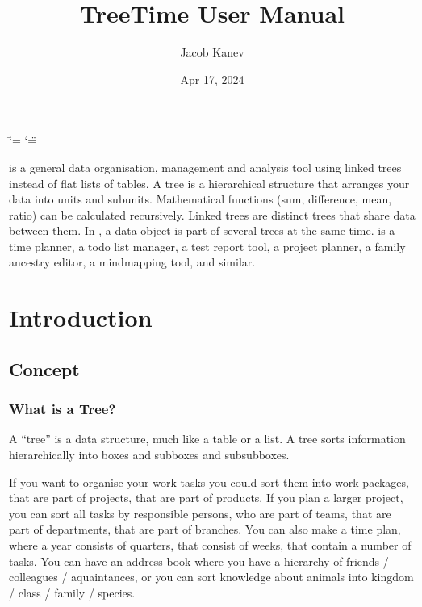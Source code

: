 \documentclass[letterpaper,10pt,english]{sphinxmanual}
\title{TreeTime User Manual}
\date{Apr 17, 2024}
\author{Jacob Kanev}
\begin{document}
\ifdefined\shorthandoff
  \ifnum\catcode`\=\string=\active\shorthandoff{=}\fi
  \ifnum\catcode`\"=\active{}\fi
\fi

\pagestyle{empty}
\sphinxmaketitle
\pagestyle{plain}
\sphinxtableofcontents
\pagestyle{normal}
\label{\detokenize{index::doc}}

\sphinxAtStartPar
{} is a general data organisation, management and analysis tool using linked trees instead of flat lists of tables.
A tree is a hierarchical structure that arranges your data into units and sub\sphinxhyphen{}units.
Mathematical functions (sum, difference, mean, ratio) can be calculated recursively.
Linked trees are distinct trees that share data between them.
In , a data object is part of several trees at the same time.
 is a time planner, a to\sphinxhyphen{}do list manager, a test report tool, a project planner, a family ancestry editor, a mind\sphinxhyphen{}mapping tool, and similar.



\sphinxstepscope


\chapter{Introduction}
\label{\detokenize{introduction:introduction}}\label{\detokenize{introduction::doc}}

\section{Concept}
\label{\detokenize{introduction:concept}}

\subsection{What is a Tree?}
\label{\detokenize{introduction:what-is-a-tree}}
\sphinxAtStartPar
A “tree” is a data structure, much like a table or a list.
A tree sorts information hierarchically into boxes and sub\sphinxhyphen{}boxes and sub\sphinxhyphen{}sub\sphinxhyphen{}boxes.

\sphinxAtStartPar
If you want to organise your work tasks you could sort them into work packages, that are part of projects, that are part of products.
If you plan a larger project, you can sort all tasks by responsible persons, who are part of teams, that are part of departments, that are part of branches.
You can also make a time plan, where a year consists of quarters, that consist of weeks, that contain a number of tasks.
You can have an address book where you have a hierarchy of friends / colleagues / aquaintances, or you can sort knowledge about animals into kingdom / class / family / species.
\end{document}

